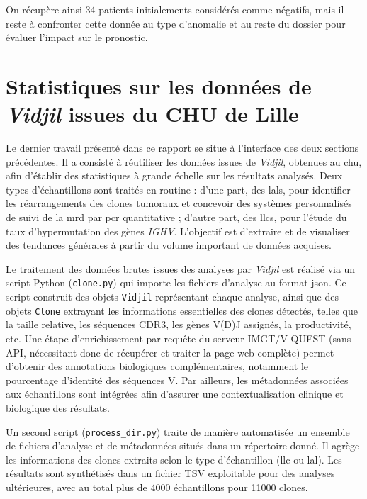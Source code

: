 

On récupère ainsi 34 patients initialements considérés comme négatifs, mais il reste 
à confronter cette donnée au type d'anomalie et au reste du dossier pour évaluer l'impact 
sur le pronostic.

\section{Statistiques sur les données de \textit{Vidjil} issues du CHU de Lille}

Le dernier travail présenté dans ce rapport se situe à l'interface des deux
sections précédentes. Il a consisté à réutiliser les données issues de
\textit{Vidjil}, obtenues au \gls{chu}, afin d'établir des statistiques à
grande échelle sur les résultats analysés. Deux types d'échantillons sont
traités en routine : d'une part, des \glspl{lal}, pour identifier les
réarrangements des clones tumoraux et concevoir des systèmes personnalisés de
suivi de la \gls{mrd} par \gls{pcr} quantitative ; d'autre part, des
\glspl{llc}, pour l'étude du taux d'hypermutation des gènes \textit{IGHV}.
L'objectif est d'extraire et de visualiser des tendances générales à partir du
volume important de données acquises.

\vspace{1em}

Le traitement des données brutes issues des analyses par \textit{Vidjil} est
réalisé via un script Python (\texttt{clone.py}) qui importe les fichiers
d'analyse au format \gls{json}. Ce script construit des objets \texttt{Vidjil}
représentant chaque analyse, ainsi que des objets \texttt{Clone} extrayant les
informations essentielles des clones détectés, telles que la taille relative,
les séquences CDR3, les gènes V(D)J assignés, la productivité, etc. Une étape
d'enrichissement par requête du serveur IMGT/V-QUEST (sans API, nécessitant
donc de récupérer et traiter la page web complète) permet d'obtenir des
annotations biologiques complémentaires, notamment le pourcentage d'identité
des séquences V. Par ailleurs, les métadonnées associées aux échantillons sont
intégrées afin d'assurer une contextualisation clinique et biologique des
résultats.

\vspace{1em}

Un second script (\texttt{process\_dir.py}) traite de manière automatisée un
ensemble de fichiers d'analyse et de métadonnées situés dans un répertoire
donné. Il agrège les informations des clones extraits selon le type
d'échantillon (\gls{llc} ou \gls{lal}). Les résultats sont synthétisés dans un
fichier TSV exploitable pour des analyses ultérieures, avec au total plus de
4000 échantillons pour 11000 clones.

